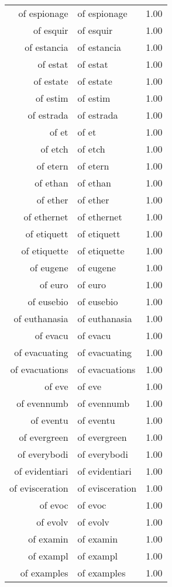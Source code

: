 \begin{table}[ht]
\begin{tabular}{rlr}
  of espionage & of espionage & 1.00 \\ 
  of esquir & of esquir & 1.00 \\ 
  of estancia & of estancia & 1.00 \\ 
  of estat & of estat & 1.00 \\ 
  of estate & of estate & 1.00 \\ 
  of estim & of estim & 1.00 \\ 
  of estrada & of estrada & 1.00 \\ 
  of et & of et & 1.00 \\ 
  of etch & of etch & 1.00 \\ 
  of etern & of etern & 1.00 \\ 
  of ethan & of ethan & 1.00 \\ 
  of ether & of ether & 1.00 \\ 
  of ethernet & of ethernet & 1.00 \\ 
  of etiquett & of etiquett & 1.00 \\ 
  of etiquette & of etiquette & 1.00 \\ 
  of eugene & of eugene & 1.00 \\ 
  of euro & of euro & 1.00 \\ 
  of eusebio & of eusebio & 1.00 \\ 
  of euthanasia & of euthanasia & 1.00 \\ 
  of evacu & of evacu & 1.00 \\ 
  of evacuating & of evacuating & 1.00 \\ 
  of evacuations & of evacuations & 1.00 \\ 
  of eve & of eve & 1.00 \\ 
  of evennumb & of evennumb & 1.00 \\ 
  of eventu & of eventu & 1.00 \\ 
  of evergreen & of evergreen & 1.00 \\ 
  of everybodi & of everybodi & 1.00 \\ 
  of evidentiari & of evidentiari & 1.00 \\ 
  of evisceration & of evisceration & 1.00 \\ 
  of evoc & of evoc & 1.00 \\ 
  of evolv & of evolv & 1.00 \\ 
  of examin & of examin & 1.00 \\ 
  of exampl & of exampl & 1.00 \\ 
  of examples & of examples & 1.00 \\ 

\end{tabular}
\end{table}
